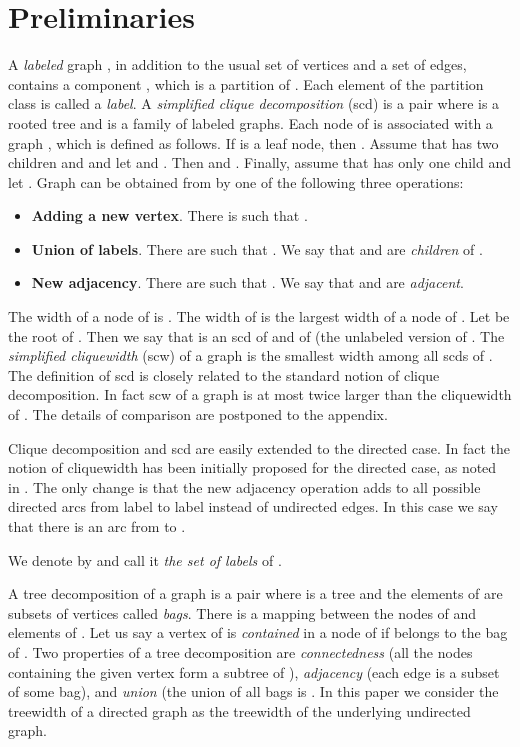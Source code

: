 \documentclass{llncs}
\begin{document}
\section{Preliminaries}
A \emph{labeled} graph , in addition to the usual set  of vertices and a set  of edges, contains
a component , which is a partition of . Each element of the partition class is called a \emph{label}.
A \emph{simplified clique decomposition} ({\sc scd}) is a pair  where  is a rooted tree and  is a family of labeled graphs.
Each node  of  is associated with a graph , which is defined as follows.
If  is a leaf node, then . Assume that  has two children  and  and let 
and .
Then  and .
Finally, assume that  has only one child  and let . Graph  can be obtained from  by one
of the following three operations:
\begin{itemize}
\item {\bf Adding a new vertex}. There is  such that .
\item {\bf Union of labels}. There are  such that  .
We say that  and  are \emph{children} of .
\item {\bf New adjacency}. There are  such that .
We say that  and  are \emph{adjacent}. 
\end{itemize}

The width of a node  of  is . The width of  is the largest width of a node  of .
Let  be the root of . Then we say that  is an {\sc scd} of  and of 
(the unlabeled version of . The \emph{simplified cliquewidth} ({\sc scw}) of a graph  is the smallest width among all 
{\sc scd}s of . The definition of {\sc scd} is closely related to the standard notion of clique decomposition. 
In fact {\sc scw} of a graph  is at most twice larger than the cliquewidth of . The details of comparison are postponed
to the appendix.

Clique decomposition and {\sc scd} are easily extended to the directed case.
In fact the notion of cliquewidth has been initially proposed for the directed case, as noted in  \cite{COMMA2010}. 
The only change is that the new adjacency operation adds to  all possible directed arcs from label  to
label  instead of undirected edges. In this case we say that there is an arc from  to .

We denote  by  and call it \emph{the set of labels} of .


 


A tree decomposition of a graph  is a pair  where  is a tree and the elements of  are subsets of vertices
called \emph{bags}. There is a mapping between the nodes of  and elements of . 
Let us say a vertex  of  is \emph{contained} in a node  of  if  belongs to the bag  of .
Two properties of a tree decomposition are \emph{connectedness} (all the nodes containing the given vertex
 form a subtree of ), \emph{adjacency} (each edge  is a subset of some bag), and \emph{union} (the union
of all bags is  . In this paper we consider the treewidth of a directed graph as the treewidth of the underlying undirected graph.
\end{document}
